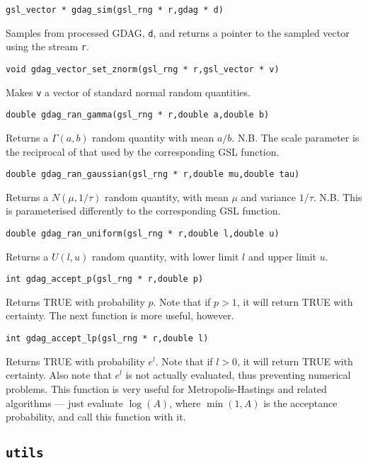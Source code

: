 \documentclass[12pt,a4paper]{article}
\begin{document}
\begin{verbatim}
gsl_vector * gdag_sim(gsl_rng * r,gdag * d)
\end{verbatim}
Samples from processed GDAG, \verb$d$, and returns a pointer to the
sampled vector using the stream \verb$r$.

\begin{verbatim}
void gdag_vector_set_znorm(gsl_rng * r,gsl_vector * v)
\end{verbatim}
Makes \verb$v$ a vector of standard normal random quantities.

\begin{verbatim}
double gdag_ran_gamma(gsl_rng * r,double a,double b)
\end{verbatim}
Returns a $\Gamma(a,b)$ random quantity with mean $a/b$. N.B. The scale
parameter is the reciprocal of that used by the corresponding GSL
function.

\begin{verbatim}
double gdag_ran_gaussian(gsl_rng * r,double mu,double tau)
\end{verbatim}
Returns a $N(\mu,1/\tau)$ random quantity, with mean $\mu$ and
variance $1/\tau$. N.B. This is parameterised differently to the
corresponding GSL function.

\begin{verbatim}
double gdag_ran_uniform(gsl_rng * r,double l,double u)
\end{verbatim}
Returns a $U(l,u)$ random quantity, with lower limit $l$ and upper
limit $u$.

\begin{verbatim}
int gdag_accept_p(gsl_rng * r,double p)
\end{verbatim}
Returns TRUE with probability $p$. Note that if $p>1$, it will return
TRUE with certainty. The next function is more useful, however.

\begin{verbatim}
int gdag_accept_lp(gsl_rng * r,double l)
\end{verbatim}
Returns TRUE with probability $e^{l}$. Note that if $l>0$, it will return
TRUE with certainty. Also note that $e^l$ is not actually evaluated,
thus preventing numerical problems. This function is very useful for
Metropolis-Hastings and related algorithms --- just evaluate
$\log(A)$, where $\min(1,A)$ is the acceptance probability, and call
this function with it.

\subsection{\texttt{utils}} 
\end{document}
